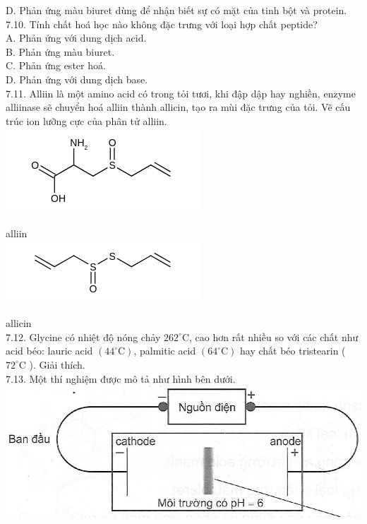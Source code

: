 \documentclass[10pt]{article}
\begin{document}
D. Phản ứng màu biuret dùng để nhận biết sự có mặt của tinh bột và protein.\\
7.10. Tính chất hoá học nào không đặc trưng với loại hợp chất peptide?\\
A. Phản ứng với dung dịch acid.\\
B. Phản ứng màu biuret.\\
C. Phản ứng ester hoá.\\
D. Phản ứng với dung dịch base.\\
7.11. Alliin là một amino acid có trong tỏi tươi, khi đập dập hay nghiền, enzyme alliinase sẽ chuyển hoá alliin thành allicin, tạo ra mùi đặc trưng của tỏi. Vẽ cấu trúc ion lưỡng cực của phân tử alliin.\\
\includegraphics{smile-13bc4f0d9d29970ff1c23a137d8b66d9512d005d}

alliin\\
\includegraphics{smile-50897823620c12b5f07fe8b0543b3856624102e9}

allicin\\
7.12. Glycine có nhiệt độ nóng chảy $262^{\circ} \mathrm{C}$, cao hơn rất nhiều so với các chất như acid béo: lauric acid $\left(44^{\circ} \mathrm{C}\right)$, palmitic acid $\left(64^{\circ} \mathrm{C}\right)$ hay chất béo tristearin ( $72^{\circ} \mathrm{C}$ ). Giải thích.\\
7.13. Một thí nghiệm được mô tả như hình bên dưới.\\
\includegraphics[max width=\textwidth, center]{2025_10_23_de6f5713836e4e91b3c8g-054(1)}
\end{document}
